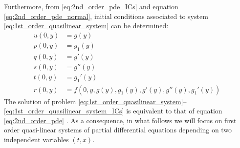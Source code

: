 Furthermore, from \eqref{eq:2nd_order_pde_ICs} and equation \eqref{eq:2nd_order_pde_normal}, initial conditions associated to system \eqref{eq:1st_order_quasilinear_system} can be determined:
\begin{equation}
  \label{eq:1st_order_quasilinear_system_ICs}
  \begin{aligned}
    u(0,y) &= g(y)\\
    p(0,y) &= g_1(y) \\
    q(0,y) &= g'(y) \\
    s(0,y) &= g''(y) \\
    t(0,y) &= g_1'(y) \\
    r(0,y) &= f(0,y,g(y),g_1(y),g'(y),g''(y),g_1'(y))
  \end{aligned}
\end{equation}
The solution of problem \eqref{eq:1st_order_quasilinear_system}--\eqref{eq:1st_order_quasilinear_system_ICs}  is equivalent to that of equation \eqref{eq:2nd_order_pde} \cite{Courant}.
As a consequence, in what follows we will focus on first order quasi-linear systems of partial differential equations depending on two independent variables $(t,x)$.

